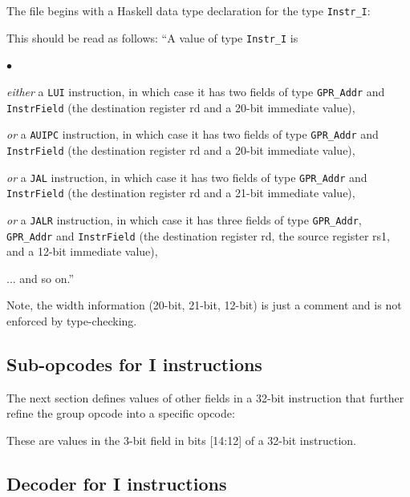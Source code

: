 \documentclass[11pt]{article}
\newenvironment{tightlist}%
{\begin{list}{$\bullet$}{%
    \setlength{\topsep}{0in}
    \setlength{\partopsep}{0in}
    \setlength{\itemsep}{0in}
    \setlength{\parsep}{0in}
    \setlength{\leftmargin}{1.5em}
    \setlength{\rightmargin}{0in}
    \setlength{\itemindent}{0in}
}
}%
{\end{list}
}
\begin{document}
The file begins with a Haskell data type declaration for the type
\verb|Instr_I|:



This should be read as follows: ``A value of type \verb|Instr_I| is
\begin{tightlist}

\item \emph{either} a \verb|LUI| instruction, in which case it has two
fields of type \verb|GPR_Addr| and
\verb|InstrField| (the destination register rd and a 20-bit immediate value),

\item \emph{or} a \verb|AUIPC| instruction, in which case it has two
fields of type \verb|GPR_Addr| and \verb|InstrField| (the destination
register rd and a 20-bit immediate value),

\item \emph{or} a \verb|JAL| instruction, in which case it has two
fields of type \verb|GPR_Addr| and \verb|InstrField| (the destination
register rd and a 21-bit immediate value),

\item \emph{or} a \verb|JALR| instruction, in which case it has three
fields of type \verb|GPR_Addr|, \verb|GPR_Addr| and \verb|InstrField|
(the destination register rd, the source register rs1, and a 12-bit
immediate value),

\item ... and so on.''

\end{tightlist}

Note, the width information (20-bit, 21-bit, 12-bit) is just a comment
and is not enforced by type-checking.


\subsection{Sub-opcodes for I instructions}

The next section defines values of other fields in a 32-bit
instruction that further refine the group opcode into a specific
opcode:



These are values in the 3-bit field in bits [14:12] of a 32-bit instruction.


\subsection{Decoder for I instructions}
\end{document}

